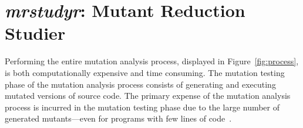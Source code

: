 
\section{\textit{mrstudyr}: Mutant Reduction Studier}

Performing the entire mutation analysis process, displayed in Figure~\ref{fig:process},
is both computationally expensive and time consuming. The mutation testing
phase of the mutation analysis process consists of generating and executing mutated versions of source code. The primary
expense of the mutation analysis process is incurred in the mutation testing phase
due to the large number of generated mutants---even for programs with few lines of code~\cite{offutt2001mutation}.






